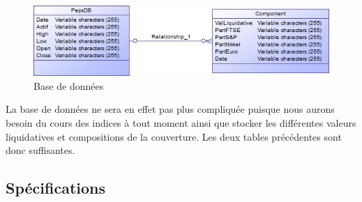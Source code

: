 \documentclass[french,12pt,a4paper]{article}
\begin{document}
\begin{figure}[h!]
  \caption{Base de données}
  \centering
    \includegraphics[scale=1]{BD.jpg}
\end{figure}

La base de données ne sera en effet pas plus compliquée puisque nous aurons besoin du cours des indices à tout moment ainsi que stocker les différentes valeurs liquidatives et compositions de la couverture. Les deux tables précédentes sont donc suffisantes.



\subsection{Spécifications}
\end{document}
